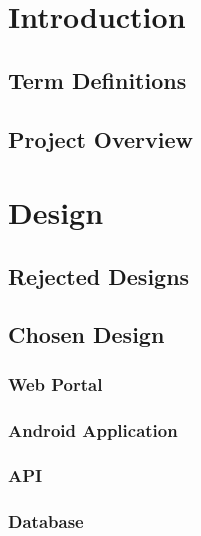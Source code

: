 \documentclass[11pt,a4paper]{report}
\begin{document}


\newpage
\setcounter{page}{1}
\tableofcontents

\newpage
\setcounter{page}{1}
\chapter*{Introduction}

\label{sec:introduction}
\section{Term Definitions}
\label{sec:term-definitions}
\section{Project Overview}
\label{sec:project-overview}

\chapter{Design}
\label{sec:design}
\section{Rejected Designs}
\label{sec:rejected-designs}
\section{Chosen Design}
\label{sec:chosen-designs}
\subsection{Web Portal}
\label{sec:web-portal-design}
\subsection{Android Application}
\label{sec:android-design}
\subsection{API}
\label{sec:api-design}
\subsection{Database}
\label{sec:database-design}
\end{document}
